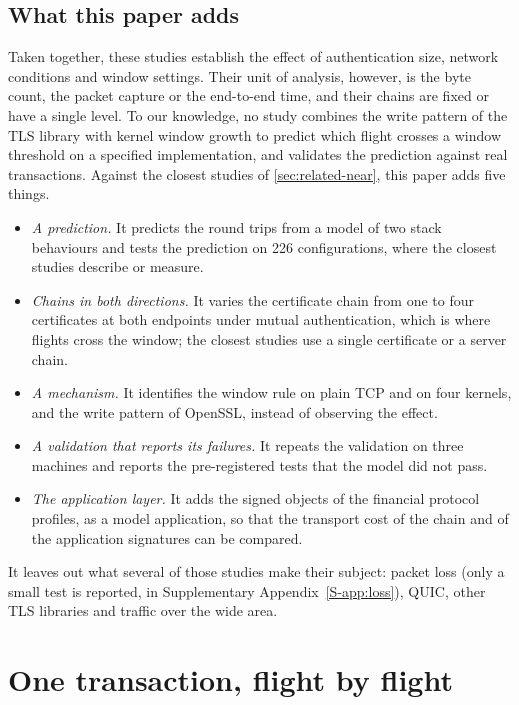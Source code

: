 \documentclass[preprint,12pt]{elsarticle}
\begin{document}
\subsection{What this paper adds}
\label{sec:related-gap}
Taken together, these studies establish the effect of authentication size, network conditions and window settings. Their unit of analysis, however, is the byte count, the packet capture or the end-to-end time, and their chains are fixed or have a single level. To our knowledge, no study combines the write pattern of the TLS library with kernel window growth to predict which flight crosses a window threshold on a specified implementation, and validates the prediction against real transactions. Against the closest studies of \cref{sec:related-near}, this paper adds five things.
\begin{itemize}
\item \emph{A prediction.} It predicts the round trips from a model of two stack behaviours and tests the prediction on 226 configurations, where the closest studies describe or measure.
\item \emph{Chains in both directions.} It varies the certificate chain from one to four certificates at both endpoints under mutual authentication, which is where flights cross the window; the closest studies use a single certificate or a server chain.
\item \emph{A mechanism.} It identifies the window rule on plain TCP and on four kernels, and the write pattern of OpenSSL, instead of observing the effect.
\item \emph{A validation that reports its failures.} It repeats the validation on three machines and reports the pre-registered tests that the model did not pass.
\item \emph{The application layer.} It adds the signed objects of the financial protocol profiles, as a model application, so that the transport cost of the chain and of the application signatures can be compared.
\end{itemize}
It leaves out what several of those studies make their subject: packet loss (only a small test is reported, in Supplementary Appendix~\ref{S-app:loss}), QUIC, other TLS libraries and traffic over the wide area.


\section{One transaction, flight by flight}
\label{sec:method}
\end{document}
